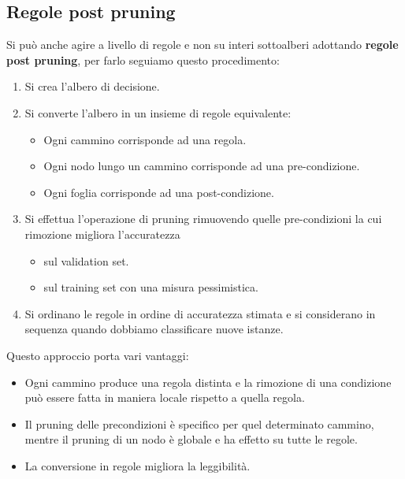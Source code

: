 \subsection{Regole post pruning}
Si pu\`o anche agire a livello di regole e non su interi sottoalberi adottando \textbf{regole post pruning}, per farlo
seguiamo questo procedimento:
\begin{enumerate}
	\item Si crea l'albero di decisione.
	\item Si converte l'albero in un insieme di regole equivalente:
	      \begin{itemize}
		      \item Ogni cammino corrisponde ad una regola.
		      \item Ogni nodo lungo un cammino corrisponde ad una pre-condizione.
		      \item Ogni foglia corrisponde ad una post-condizione.
	      \end{itemize}
	\item Si effettua l'operazione di pruning rimuovendo quelle pre-condizioni la cui rimozione migliora l'accuratezza
	      \begin{itemize}
		      \item sul validation set.
		      \item sul training set con una misura pessimistica.
	      \end{itemize}
	\item Si ordinano le regole in ordine di accuratezza stimata e si considerano in sequenza quando dobbiamo
	      classificare nuove istanze.
\end{enumerate}
Questo approccio porta vari vantaggi:
\begin{itemize}
	\item Ogni cammino produce una regola distinta e la rimozione di una condizione pu\`o essere fatta in maniera
	      locale rispetto a quella regola.
	\item Il pruning delle precondizioni \`e specifico per quel determinato cammino, mentre il pruning di un nodo
	      \`e globale e ha effetto su tutte le regole.
	\item La conversione in regole migliora la leggibilit\`a.
\end{itemize}